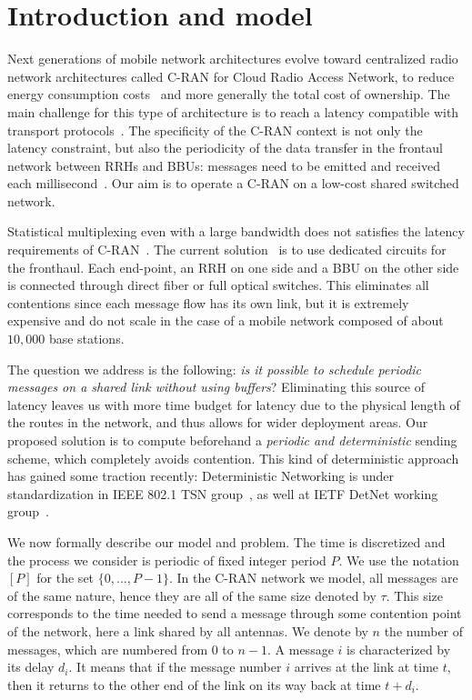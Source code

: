 \documentclass[10pt, conference, letterpaper]{algotel}
\begin{document}
\section{Introduction and model}

Next generations of mobile network architectures evolve toward centralized radio network architectures called C-RAN for Cloud Radio Access Network, to reduce energy consumption costs~\cite{mobile2011c} and more generally the total cost of ownership. The main challenge for this type of architecture is to reach a latency compatible with transport protocols~\cite{ieeep802}. The specificity of the C-RAN context is not only the latency constraint, but also the periodicity of the data transfer in the frontaul network between RRHs and BBUs: messages need to be emitted and received each millisecond~\cite{bouguen2012lte}. Our aim is to operate a C-RAN on a low-cost shared switched network. 

 Statistical multiplexing even with a large bandwidth does not satisfies the latency requirements of C-RAN~\cite{dominique2018deterministic,barth2018deterministic}. The current solution~\cite{pizzinat2015things,tayq2017real} is to use dedicated circuits for the fronthaul. Each end-point, an RRH on one side and a BBU on the other side is connected through direct fiber or full optical switches. This eliminates all contentions since each message flow has its own link, but it is extremely expensive and do not scale in the case of a mobile network composed of about $10,000$ base stations. 

The question we address is the following: \emph{is it possible to schedule periodic messages on a shared link without using buffers}? Eliminating this source of latency leaves us with more time budget for latency due to the physical length of the routes in the network, and thus allows for wider deployment areas. Our proposed solution is to compute beforehand a \emph{periodic and deterministic} sending scheme, which completely avoids contention. This kind of deterministic approach has gained some traction recently: Deterministic Networking is under standardization in IEEE 802.1 TSN group~\cite{finn-detnet-architecture-08}, as well at IETF DetNet working group~\cite{ieee802}.

We now formally describe our model and problem.
The time is discretized and the process we consider is periodic of fixed integer period $P$. We use the notation $[P]$ for the set $\{0,\dots,P-1\}$. In the C-RAN network we model, all messages are of the same nature, hence they are all of the same size denoted by $\tau$. This size corresponds to the time needed to send a message through some contention point of the network, here a link shared by all antennas. We denote by $n$ the number of messages, which are numbered from $0$ to $n-1$. A message $i$ is characterized by its delay $d_i$. It means that if the message number $i$ arrives at the link at time $t$, then it returns to the other end of the link on its way back at time $t + d_i$. 
\end{document}
